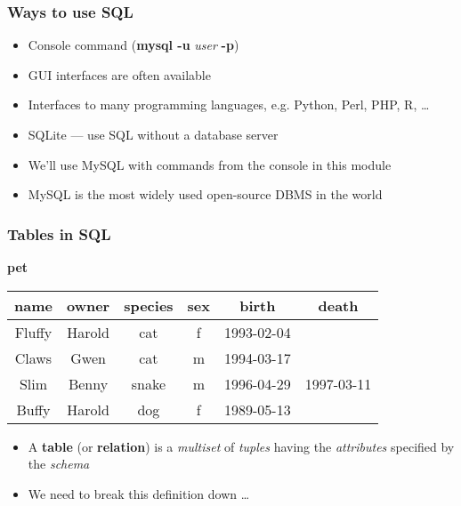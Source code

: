 \documentclass[hyperref={pdfpagelabels=false},svgnames,xcolor=table]{beamer}
\begin{document}
\begin{frame}
  \frametitle{Ways to use SQL}
  \begin{itemize}
    \item Console command (\textbf{mysql -u} \emph{user} \textbf{-p})
    \item GUI interfaces are often available
    \item Interfaces to many programming languages, e.g. Python, Perl, PHP,
      R, \ldots
    \item SQLite --- use SQL without a database server
    \item We'll use MySQL with commands from the console in this module
    \item MySQL is the most widely used open-source DBMS in the world
  \end{itemize}
\end{frame}

\begin{frame}
  \frametitle{Tables in SQL}
  \textbf{pet} \\
  \begin{tabular}{|c|c|c|c|c|c|}
    \hline
    \textbf{name} & \textbf{owner} & \textbf{species} & \textbf{sex} & \textbf{birth} & \textbf{death} \\
    \hline
    Fluffy & Harold & cat & f & 1993-02-04 & \\
    \hline
    Claws & Gwen & cat & m & 1994-03-17 & \\
    \hline
    Slim & Benny & snake & m & 1996-04-29 & 1997-03-11 \\
    \hline
    Buffy & Harold & dog & f & 1989-05-13 & \\
    \hline
  \end{tabular}
  \bigskip
  \begin{itemize}
    \item A \textbf{table} (or \textbf{relation}) is a \emph{multiset} of
      \emph{tuples} having the \emph{attributes} specified by the
      \emph{schema}
    \item We need to break this definition down \ldots
  \end{itemize}
\end{frame}
\end{document}
